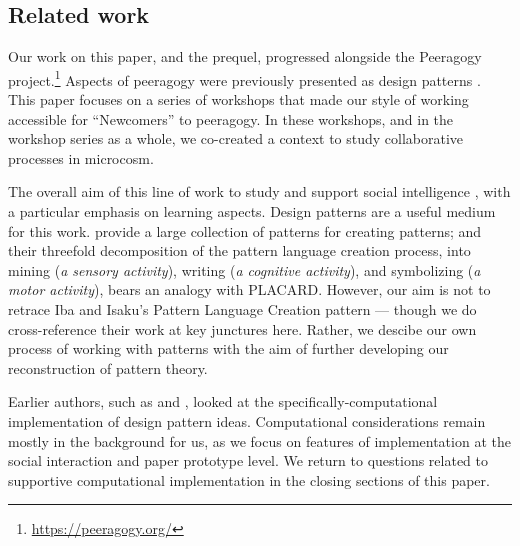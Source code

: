 \documentclass[acmlarge,timestamp]{acmart}
\DeclareRobustCommand{\scitshape}{\fontshape{\scitdefault}\selectfont}
\begin{document}
\subsection{Related work}
Our work on this paper, and the prequel, progressed alongside the
Peeragogy project.\footnote{\url{https://peeragogy.org/}} Aspects of
peeragogy were previously presented as design patterns
\cite{corneli2015a}.  This paper focuses on a series of workshops that
made our style of working accessible for “{\scitshape Newcomer}\hspace{.05em}s\hspace{.05em}” to peeragogy.  In these workshops, and in the workshop series as
a whole, we co-created a context to study collaborative processes in
microcosm.

The overall aim of this line of work to study and support social
intelligence \cite{benkler2015peer}, with a particular emphasis on
learning aspects.  Design patterns are a useful medium for this work.
\citet{iba2016pattern} provide a large collection of patterns for
creating patterns; and their threefold decomposition of the pattern
language creation process, into mining (\emph{a sensory activity}),
writing (\emph{a cognitive activity}), and symbolizing (\emph{a motor
activity}), bears an analogy with PLACARD.  However, our aim is not to
retrace Iba and Isaku’s {\scitshape Pattern Language Creation} pattern
— though we do cross-reference their work at key junctures here.
Rather, we descibe our own process of working with patterns with the
aim of further developing our reconstruction of pattern theory.

Earlier authors, such as \citet{moran1971a} and \citet{OXMAN1994141},
looked at the specifically-computational implementation of design
pattern ideas.  Computational considerations remain mostly in the
background for us, as we focus on features of implementation at the
social interaction and paper prototype level.  We return to questions
related to supportive computational implementation in the closing
sections of this paper.
\end{document}
